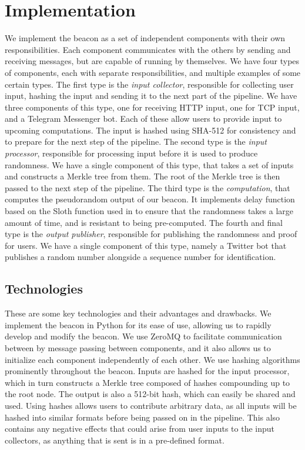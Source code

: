 \section{Implementation}
\label{sec:implementation}
We implement the beacon as  a set of independent components with their own responsibilities. Each component communicates with the others by sending and receiving messages, but are capable of running by themselves. We have four types of components, each with separate responsibilities, and multiple examples of some certain types.
The first type is the \emph{input collector}, responsible for collecting user input, hashing the input and sending it to the next part of the pipeline. We have three components of this type, one for receiving HTTP input, one for TCP input, and a Telegram Messenger bot. Each of these allow users to provide input to upcoming computations. The input is hashed using SHA-512 for consistency and to prepare for the next step of the pipeline.
The second type is the \emph{input processor}, responsible for processing input before it is used to produce randomness. We have a single component of this type, that takes a set of inputs and constructs a Merkle tree from them. The root of the Merkle tree is then passed to the next step of the pipeline.
The third type is the \emph{computation}, that computes the pseudorandom output of our beacon. It implements delay function based on the Sloth function used in \cite{randomzoo} to ensure that the randomness takes a large amount of time, and is resistant to being pre-computed.
The fourth and final type is the \emph{output publisher}, responsible for publishing the randomness and proof for users. We have a single component of this type, namely a Twitter bot that publishes a random number alongside a sequence number for identification.

\subsection{Technologies}
\label{sub:technologies}
These are some key technologies and their advantages and drawbacks.
We implement the beacon in Python for its ease of use, allowing us to rapidly develop and modify the beacon. We use ZeroMQ to facilitate communication between by message passing between components, and it also allows us to initialize each component independently of each other. 
We use hashing algorithms prominently throughout the beacon. Inputs are hashed for the input processor, which in turn constructs a Merkle tree composed of hashes compounding up to the root node. The output is also a 512-bit hash, which can easily be shared and used. Using hashes allows users to contribute arbitrary data, as all inputs will be hashed into similar formats before being passed on in the pipeline. This also contains any negative effects that could arise from user inputs to the input collectors, as anything that is sent is in a pre-defined format.